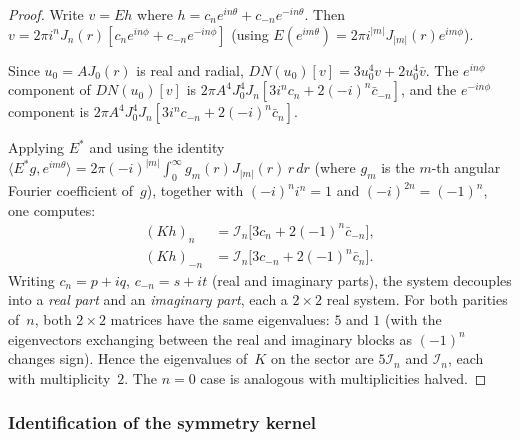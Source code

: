\documentclass[12pt]{article}
\theoremstyle{definition}
\theoremstyle{remark}
\begin{document}
\begin{proof}
  Write $v=Eh$ where $h=c_ne^{in\theta}+c_{-n}e^{-in\theta}$.  Then
  $v=2\pi i^n J_n(r)[c_ne^{in\phi}+c_{-n}e^{-in\phi}]$
  (using $E(e^{im\theta})=2\pi i^{|m|}J_{|m|}(r)e^{im\phi}$).

  Since $u_0=AJ_0(r)$ is real and radial,
  $DN(u_0)[v]=3u_0^4 v+2u_0^4\bar v$. The $e^{in\phi}$ component of
  $DN(u_0)[v]$ is $2\pi A^4J_0^4J_n[3i^nc_n+2(-i)^n\bar c_{-n}]$,
  and the $e^{-in\phi}$ component is
  $2\pi A^4J_0^4J_n[3i^nc_{-n}+2(-i)^n\bar c_n]$.

  Applying $E^*$ and using the identity
  $\langle E^*g,e^{im\theta}\rangle=2\pi(-i)^{|m|}\int_0^\infty
  g_m(r)J_{|m|}(r)\,r\,dr$
  (where $g_m$ is the $m$-th angular Fourier coefficient of~$g$),
  together with $(-i)^ni^n=1$ and $(-i)^{2n}=(-1)^n$, one computes:
  \begin{align}
    (Kh)_n &= \mathcal I_n\bigl[3c_n+2(-1)^n\bar c_{-n}\bigr],
    \label{eq:Kn}\\
    (Kh)_{-n} &= \mathcal I_n\bigl[3c_{-n}+2(-1)^n\bar c_n\bigr].
    \label{eq:K-n}
  \end{align}
  Writing $c_n=p+iq$, $c_{-n}=s+it$ (real and imaginary parts), the system
  decouples into a \emph{real part} and an \emph{imaginary part}, each a
  $2\times 2$ real system.  For both parities of~$n$, both $2\times 2$
  matrices have the same eigenvalues: $5$ and $1$ (with the eigenvectors
  exchanging between the real and imaginary blocks as $(-1)^n$ changes sign).
  Hence the eigenvalues of~$K$ on the sector are $5\mathcal I_n$ and
  $\mathcal I_n$, each with multiplicity~$2$.
  The $n=0$ case is analogous with multiplicities halved.
\end{proof}

\subsubsection{Identification of the symmetry kernel}
\end{document}

